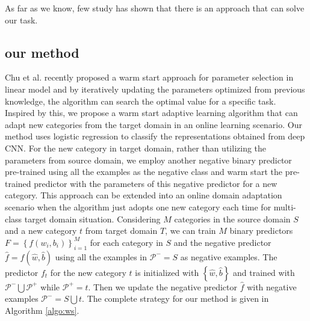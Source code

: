 As far as we know, few study has shown that there is an approach that can solve our task.
\subsection{our method}
Chu et al. recently proposed a warm start approach for parameter selection in linear model and by iteratively updating the parameters optimized from previous knowledge, the algorithm can search the optimal value for a specific task\cite{chuwarm}. Inspired by this, we propose a warm start adaptive learning algorithm that can adapt new categories from the target domain in an online learning scenario. Our method uses logistic regression to classify the representations obtained from deep CNN. For the new category in target domain, rather than utilizing the parameters from source domain, we employ another negative binary predictor pre-trained using all the examples as the negative class and warm start the pre-trained predictor with the parameters of this negative predictor for a new category. This approach can be extended into an online domain adaptation scenario when the algorithm just adopts one new category each time for multi-class target domain situation. Considering $M$ categories in the source domain $S$ and a new category $t$ from target domain $T$, we can train $M$ binary predictors $F=\left\{ {{f}\left( {{w_i},{b_i}} \right)} \right\}_{i = 1}^M$ for each category in $S$ and the negative predictor $\hat{f}=f(\hat{w},\hat{b})$ using all the examples in $\mathcal{P^-}=S$ as negative examples. The predictor $f_t$ for the new category $t$ is initialized with $\left\{\hat{w},\hat{b}\right\}$ and trained with $\mathcal{P^-}\bigcup\mathcal{P^+}$ while $\mathcal{P^+}=t$. Then we update the negative predictor $\hat{f}$ with negative examples $\mathcal{P^-}=S\bigcup t$. The complete strategy for our method is given in Algorithm \ref{algo:ws}.
